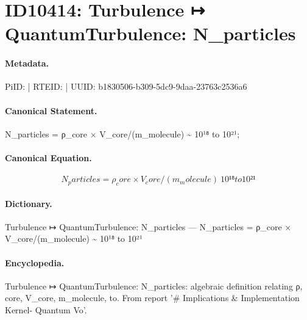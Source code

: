 \section*{ID10414: Turbulence ↦ QuantumTurbulence: N\_particles}
\paragraph{Metadata.}
PiID:  | RTEID:  | UUID: b1830506-b309-5dc9-9daa-23763c2536a6

\paragraph{Canonical Statement.}
N\_particles = ρ\_core × V\_core/(m\_molecule) \textasciitilde{} 10¹⁸ to 10²¹;

\paragraph{Canonical Equation.}
\[
N_particles = ρ_core × V_core/(m_molecule) ~ 10¹⁸ to 10²¹
\]

\paragraph{Dictionary.}
Turbulence ↦ QuantumTurbulence: N\_particles — N\_particles = ρ\_core × V\_core/(m\_molecule) \textasciitilde{} 10¹⁸ to 10²¹

\paragraph{Encyclopedia.}
Turbulence ↦ QuantumTurbulence: N\_particles: algebraic definition relating ρ, core, V\_core, m\_molecule, to. From report '\# Implications \& Implementation Kernel- Quantum Vo'.
